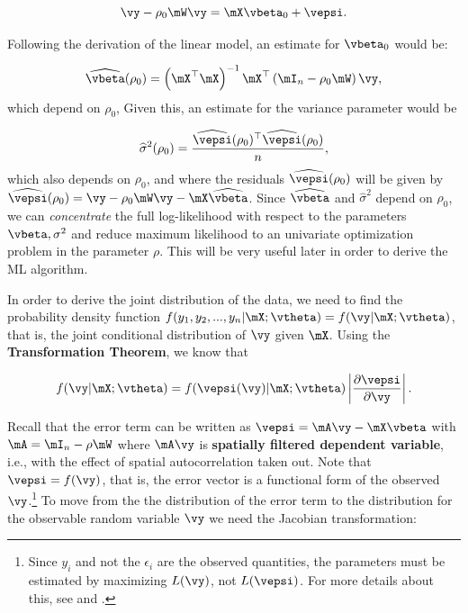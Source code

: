 \documentclass[english,12pt]{book}\usepackage[]{graphicx}\usepackage[]{xcolor}
\begin{document}
\begin{equation*}
\vy - \rho_0\mW\vy = \mX\vbeta_0 + \vepsi.
\end{equation*}

Following the derivation of the linear model, an estimate for $\vbeta_0$ would be:

\begin{equation*}
\widehat{\vbeta}(\rho_0) = \left(\mX^\top \mX\right)^{-1}\mX^\top\left(\mI_n - \rho_0\mW\right)\vy,
\end{equation*}
%
which depend on $\rho_0$, Given this, an estimate for the variance parameter would be

\begin{equation*}
\widehat{\sigma}^2(\rho_0) = \frac{\widehat{\vepsi}(\rho_0)^\top\widehat{\vepsi}(\rho_0)}{n},
\end{equation*}
%
which also depends on $\rho_0$, and where the residuals $\widehat{\vepsi}(\rho_0)$ will be given by $\widehat{\vepsi}(\rho_0)=\vy - \rho_0\mW\vy - \mX\widehat{\vbeta}$. Since $\widehat{\vbeta}$ and $\widehat{\sigma}^2$ depend on $\rho_0$, we can \emph{concentrate} the full log-likelihood with respect to the parameters $\vbeta, \sigma^2$ and reduce maximum likelihood to an univariate optimization problem in the parameter $\rho$. This will be very useful later in order to derive the ML algorithm.

In order to derive the joint distribution of the data, we need to find the probability density function $f(y_1, y_2,...,y_n| \mX; \vtheta) = f(\vy|\mX;\vtheta)$, that is, the joint conditional distribution of $\vy$ given $\mX$. Using the \textbf{Transformation Theorem}, we know that

\begin{equation*}
  f(\vy | \mX; \vtheta) = f(\vepsi(\vy)| \mX; \vtheta) \left|\frac{\partial \vepsi}{\partial \vy}\right|.
\end{equation*}

Recall that the error term can be written as $\vepsi = \mA\vy - \mX\vbeta$ with $\mA=\mI_n - \rho\mW$ where $\mA\vy$ is \textbf{spatially filtered dependent variable}, i.e., with the effect of spatial autocorrelation taken out. Note that $\vepsi = f(\vy)$, that is, the error vector is a functional form of the observed $\vy$.\footnote{Since $y_i$ and not the $\epsilon_i$ are the observed quantities, the parameters must be estimated by maximizing $L(\vy)$, not $L(\vepsi)$. For more details about this, see \cite{mead1967mathematical} and \cite{doreian1981estimating}.} To move from the the distribution of the error term to the distribution for the observable random variable $\vy$ we need the Jacobian transformation:
\end{document}
